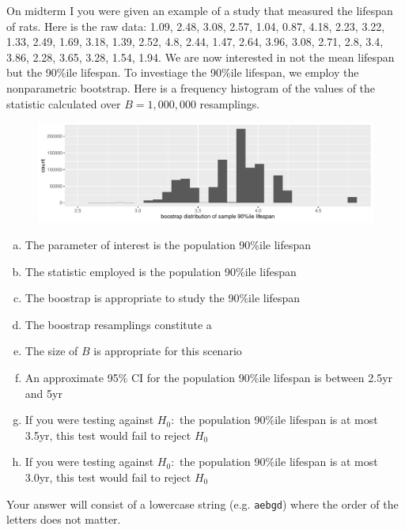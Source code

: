 \documentclass[12pt,landscape]{article}
\newcommand{\instr}{\small Your answer will consist of a lowercase string (e.g. \texttt{aebgd}) where the order of the letters does not matter. \normalsize}
\begin{document}

\problem{} On midterm I you were given an example of a study that measured the lifespan of rats. Here is the raw data: 1.09, 2.48, 3.08, 2.57, 1.04, 0.87, 4.18, 2.23, 3.22, 1.33, 2.49, 1.69, 3.18, 1.39, 2.52, 4.8, 2.44, 1.47, 2.64, 3.96, 3.08, 2.71, 2.8, 3.4, 3.86, 2.28, 3.65, 3.28, 1.54, 1.94. We are now interested in not the mean lifespan but the 90\%ile lifespan. To investiage the 90\%ile lifespan, we employ the nonparametric bootstrap. Here is a frequency histogram of the values of the statistic calculated over $B = 1,000,000$ resamplings.

\begin{figure}[h]
\centering
\includegraphics[width=5in]{bootstrap}
\end{figure}

\vspace{-0.2cm}\benum{} 

\begin{enumerate}[(a)]
\item The parameter of interest is the population 90\%ile lifespan
\item The statistic employed is the population 90\%ile lifespan
\item The boostrap is appropriate to study the 90\%ile lifespan
\item The boostrap resamplings constitute a 
\item The size of $B$ is appropriate for this scenario
\item An approximate 95\% CI for the population 90\%ile lifespan is between 2.5yr and 5yr
\item If you were testing against $H_0:$ the population 90\%ile lifespan is at most 3.5yr, this test would fail to reject $H_0$
\item If you were testing against $H_0:$ the population 90\%ile lifespan is at most 3.0yr, this test would fail to reject $H_0$
\end{enumerate}
\eenum\instr\pagebreak

\end{document}
